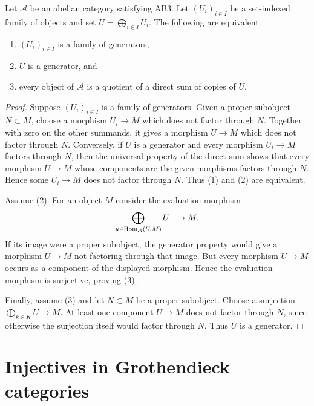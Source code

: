 \begin{lemma}
\label{lemma-generator-family}
\begin{reference}
\cite[Chapter I, \S 1.9, Proposition 1.9.1, p. 134]{Tohoku}
\end{reference}
Let $\mathcal{A}$ be an abelian category satisfying AB3. Let
$(U_i)_{i \in I}$ be a set-indexed family of objects and set
$U = \bigoplus_{i \in I} U_i$. The following are equivalent:
\begin{enumerate}
\item $(U_i)_{i \in I}$ is a family of generators,
\item $U$ is a generator, and
\item every object of $\mathcal{A}$ is a quotient of a direct sum of copies
of $U$.
\end{enumerate}
\end{lemma}

\begin{proof}
Suppose $(U_i)_{i \in I}$ is a family of generators. Given a proper
subobject $N \subset M$, choose a morphism $U_i \to M$ which does not factor
through $N$. Together with zero on the other summands, it gives a morphism
$U \to M$ which does not factor through $N$. Conversely, if $U$ is a
generator and every morphism $U_i \to M$ factors through $N$, then the
universal property of the direct sum shows that every morphism $U \to M$
whose components are the given morphisms factors through $N$. Hence some
$U_i \to M$ does not factor through $N$. Thus (1) and (2) are equivalent.

Assume (2). For an object $M$ consider the evaluation morphism
$$
\bigoplus_{u \in \mathop{\mathrm{Hom}}\nolimits_\mathcal{A}(U, M)} U \longrightarrow M.
$$
If its image were a proper subobject, the generator property would give a
morphism $U \to M$ not factoring through that image. But every morphism
$U \to M$ occurs as a component of the displayed morphism. Hence the
evaluation morphism is surjective, proving (3).

Finally, assume (3) and let $N \subset M$ be a proper subobject. Choose a
surjection $\bigoplus_{k \in K} U \to M$. At least one component
$U \to M$ does not factor through $N$, since otherwise the surjection itself
would factor through $N$. Thus $U$ is a generator.
\end{proof}



\section{Injectives in Grothendieck categories}
\label{section-grothendieck-categories}

